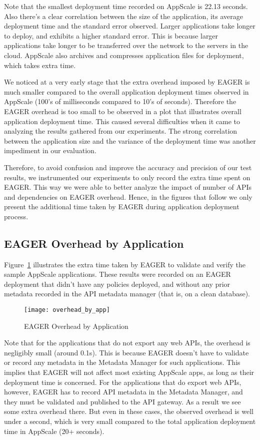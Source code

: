 Note that the smallest deployment time recorded on AppScale is 22.13 seconds. Also there's a clear correlation between the
size of the application, its average deployment time and the standard error observed. Larger applications take longer to deploy,
and exhibits a higher standard error. This is because larger applications take longer to be transferred over the network to the 
servers in the cloud. AppScale also archives and compresses application files for deployment, which takes extra
time.

We noticed at a very early stage that the extra overhead imposed by EAGER is much smaller compared to the overall application
deployment times observed in AppScale (100's of milliseconds compared to 10's of seconds). Therefore the EAGER overhead
is too small to be observed in a plot that illustrates overall application deployment time. This caused several difficulties when it
came to analyzing the results gathered from our experiments. The strong correlation between the
application size and the variance of the deployment time was another impediment in our evaluation.

Therefore, to avoid confusion and improve the accuracy and precision of our test results, we instrumented our experiments to
only record the extra time spent on EAGER. This way we were able to better analyze the impact of number of APIs and dependencies
on EAGER overhead. Hence, in the figures that follow we only present the additional time taken by EAGER during application
deployment process.

\subsection{EAGER Overhead by Application}

Figure~\ref{fig:overhead_by_app} illustrates the extra time taken by EAGER to validate and verify the sample AppScale applications.
These results were recorded on an EAGER deployment that didn't have any policies deployed, and without any prior
metadata recorded in the API metadata manager (that is, on a clean database).

\begin{figure}
\centering
\texttt{[image: overhead\_by\_app]}
\caption{EAGER Overhead by Application}
\label{fig:overhead_by_app}
\end{figure}

Note that for the applications that do not export any web APIs, the overhead is negligibly small (around 0.1s). This is because EAGER
doesn't have to validate or record any metadata in the Metadata Manager for such applications. This implies that EAGER will not affect 
most existing AppScale apps, as long as their deployment time is concerned. For the applications that do 
export web APIs, however, EAGER has to record API metadata in the Metadata Manager, and they must be validated and published to 
the API gateway. As a result we see some extra overhead there. But even in these cases, the observed overhead is well under a second,
which is very small compared to the total application deployment time in AppScale (20+ seconds).

